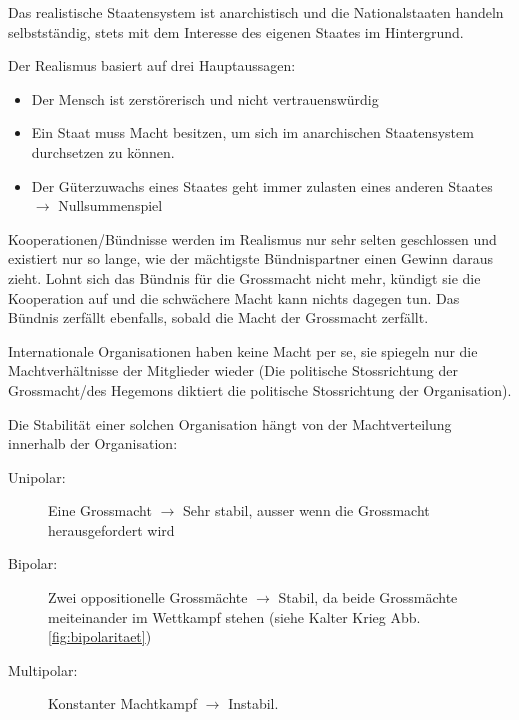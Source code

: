 \documentclass[a4paper, 11pt]{article}
\begin{document}
\vspace{10px}

\noindent Das realistische Staatensystem ist anarchistisch und die Nationalstaaten handeln selbstständig, stets mit dem Interesse des eigenen Staates im Hintergrund.

\vspace{10px}

\noindent Der Realismus basiert auf drei Hauptaussagen:

\begin{itemize}
	\item Der Mensch ist zerstörerisch und nicht vertrauenswürdig
	\item Ein Staat muss Macht besitzen, um sich im anarchischen Staatensystem durchsetzen zu können.
	\item Der Güterzuwachs eines Staates geht immer zulasten eines anderen Staates $\rightarrow$ Nullsummenspiel
\end{itemize}

Kooperationen/Bündnisse werden im Realismus nur sehr selten geschlossen und existiert nur so lange, wie der mächtigste Bündnispartner einen Gewinn daraus zieht. Lohnt sich das Bündnis für die Grossmacht nicht mehr, kündigt sie die Kooperation auf und die schwächere Macht kann nichts dagegen tun. Das Bündnis zerfällt ebenfalls, sobald die Macht der Grossmacht zerfällt.

Internationale Organisationen haben keine Macht per se, sie spiegeln nur die Machtverhältnisse der Mitglieder wieder (Die politische Stossrichtung der Grossmacht/des Hegemons diktiert die politische Stossrichtung der Organisation). 

\vspace{10px}

\noindent Die Stabilität einer solchen Organisation hängt von der Machtverteilung innerhalb der Organisation:

\begin{description}
	\item[Unipolar: ] Eine Grossmacht $\rightarrow$ Sehr stabil, ausser wenn die Grossmacht herausgefordert wird
    \item[Bipolar: ] Zwei oppositionelle Grossmächte $\rightarrow$ Stabil, da beide Grossmächte meiteinander im Wettkampf stehen (siehe Kalter Krieg Abb.  \ref{fig:bipolaritaet})
	\item[Multipolar: ] Konstanter Machtkampf $\rightarrow$ Instabil.
\end{description}
\end{document}
